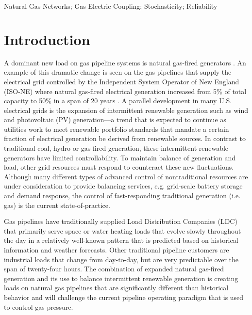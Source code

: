 \documentclass[10pt, conference, compsocconf]{IEEEtran}
\begin{document}
\begin{IEEEkeywords}
Natural Gas Networks; Gas-Electric Coupling; Stochasticity; Reliability
\end{IEEEkeywords}


\IEEEpeerreviewmaketitle

\section{Introduction}
\label{sec:intro}


A dominant new load on gas pipeline systems is natural gas-fired generators \cite{2010MITEI,2013MITEI}.   An example of this dramatic change is seen on the gas pipelines that supply the electrical grid controlled by the Independent System Operator of New England (ISO-NE) where natural gas-fired electrical generation increased from 5\% of total capacity to 50\% in a span of 20 years \cite{ISO-NE}.  A parallel development in many U.S. electrical grids is the expansion of intermittent renewable generation such as wind and photovoltaic (PV) generation---a trend that is expected to continue as utilities work to meet renewable portfolio standards \cite{portfolio_renewables,cost_renewables} that mandate a certain fraction of electrical generation be derived from renewable sources. In contrast to traditional coal, hydro or gas-fired generation, these intermittent renewable generators have limited controllability.  To maintain balance of generation and load, other grid resources must respond to counteract these new fluctuations.  Although many different types of advanced control of nontraditional resources are under consideration to provide balancing services, e.g. grid-scale battery storage and demand response, the control of fast-responding traditional generation (i.e. gas) is the current state-of-practice.

Gas pipelines have traditionally supplied Load Distribution Companies (LDC) that primarily serve space or water heating loads that evolve slowly throughout the day in a relatively well-known pattern that is predicted based on historical information and weather forecasts. Other traditional pipeline customers are industrial loads that change from day-to-day, but are very predictable over the span of twenty-four hours. The combination of expanded natural gas-fired generation and its use to balance intermittent renewable generation is creating loads on natural gas pipelines that are significantly different than historical behavior and will challenge the current pipeline operating paradigm that is used to control gas pressure.
\end{document}
